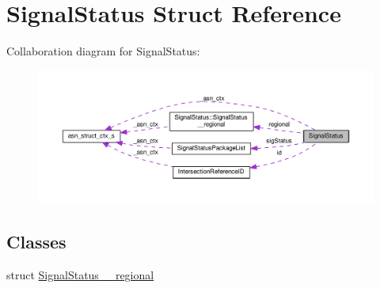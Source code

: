 \hypertarget{structSignalStatus}{}\section{Signal\+Status Struct Reference}
\label{structSignalStatus}


Collaboration diagram for Signal\+Status\+:\nopagebreak
\begin{figure}[H]
\begin{center}
\leavevmode
\includegraphics[width=350pt]{structSignalStatus__coll__graph}
\end{center}
\end{figure}
\subsection*{Classes}
\begin{DoxyCompactItemize}
\item 
struct \hyperlink{structSignalStatus_1_1SignalStatus____regional}{Signal\+Status\+\_\+\+\_\+regional}
\end{DoxyCompactItemize}
